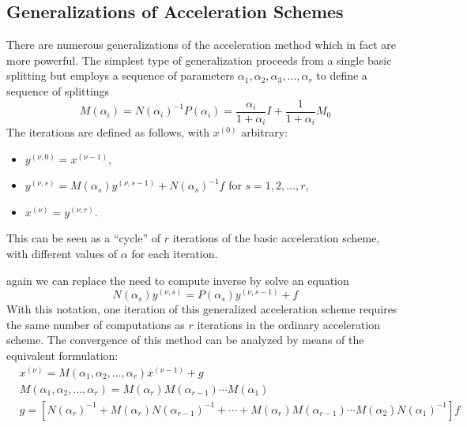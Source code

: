 \documentclass[../main.tex]{subfiles}
\begin{document}
\subsection{Generalizations of Acceleration Schemes}
There are numerous generalizations of the acceleration method which in fact are more powerful. The simplest type of generalization proceeds from a single basic splitting but employs a sequence of parameters $\alpha_1, \alpha_2, \alpha_3, \ldots, \alpha_r$ to define a sequence of splittings
\begin{equation*}
	M(\alpha_i) = N(\alpha_i)^{-1} P(\alpha_i) = \frac{\alpha_i}{1 + \alpha_i} I + \frac{1}{1 + \alpha_i} M_0
\end{equation*}
The iterations are defined as follows, with $x^{(0)}$ arbitrary:
\begin{itemize}
	\item $y^{(\nu, 0)} = x^{(\nu-1)}$,
	\item $y^{(\nu, s)} = M(\alpha_s) y^{(\nu, s-1)} + N(\alpha_s)^{-1} f$ for $s = 1, 2, \ldots, r$,
	\item $x^{(\nu)} = y^{(\nu, r)}$.
\end{itemize}
\begin{remark}
	This can be seen as a ``cycle'' of $r$ iterations of the basic acceleration scheme, with different values of $\alpha$ for each iteration.
\end{remark}
again we can replace the need to compute inverse by solve an equation
\begin{equation*}
	N(\alpha_s) y^{(\nu, s)} = P(\alpha_s) y^{(\nu, s-1)} + f
\end{equation*}
With this notation, one iteration of this generalized acceleration scheme requires the same number of computations as $r$ iterations in the ordinary acceleration scheme. The convergence of this method can be analyzed by means of the equivalent formulation:
\begin{equation*}
	\begin{aligned}
		 & x^{(\nu)} = M(\alpha_1, \alpha_2, \ldots, \alpha_r) x^{(\nu-1)} + g                                                                    \\
		 & M(\alpha_1, \alpha_2, \ldots, \alpha_r) = M(\alpha_r) M(\alpha_{r-1}) \cdots M(\alpha_1)                                               \\
		 & g = [N(\alpha_r)^{-1} + M(\alpha_r) N(\alpha_{r-1})^{-1} + \cdots + M(\alpha_r) M(\alpha_{r-1}) \cdots M(\alpha_2) N(\alpha_1)^{-1}] f
	\end{aligned}
\end{equation*}
\end{document}
